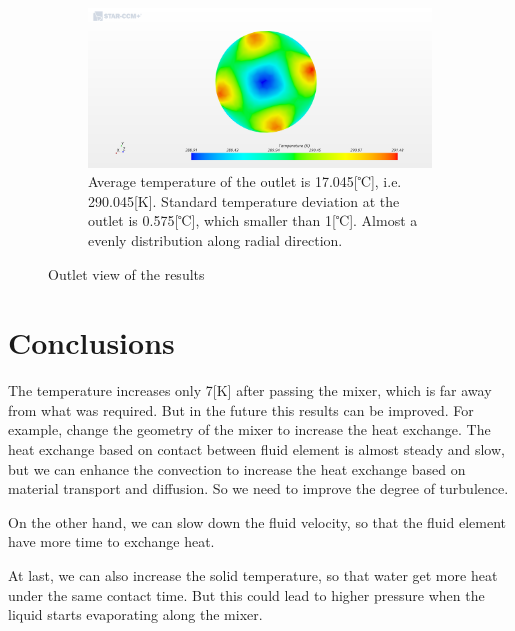 \documentclass[journal,article,processes,submit,moreauthors,pdftex]{Definitions/mdpi}
\begin{document}
\begin{figure}
\begin{center}
\centering
\begin{subfigure}[b]{1.0\textwidth}
\includegraphics[width=\linewidth]{./docu_pictures/result3.png}
\caption*{Average temperature of the outlet is 17.045[℃], i.e. 290.045[K]. Standard temperature deviation at the outlet is 0.575[℃], which smaller than 1[℃]. Almost a evenly distribution along radial direction.}
\end{subfigure}
\end{center}
\caption{Outlet view of the results}
\label{outlet-result-pictures}
\end{figure}


\section{Conclusions}

The temperature increases only 7[K] after passing the mixer, which is far away from what was required. But in the future this results can be improved. For example, change the geometry of the mixer to increase the heat exchange. The heat exchange based on contact between fluid element is almost steady and slow, but we can enhance the convection to increase the heat exchange based on material transport and diffusion. So we need to improve the degree of turbulence. 

On the other hand, we can slow down the fluid velocity, so that the fluid element have more time to exchange heat. 

At last, we can also increase the solid temperature, so that water get more heat under the same contact time. But this could lead to higher pressure when the liquid starts evaporating along the mixer.

\vspace{6pt} 
\end{document}
